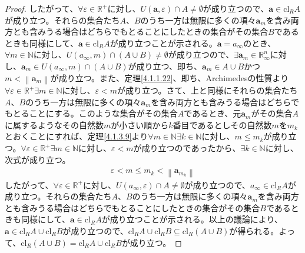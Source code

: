 \documentclass[dvipdfmx]{jsarticle}
\begin{document}
\begin{proof}
したがって、$\forall\varepsilon \in \mathbb{R}^{+}$に対し、$U\left( \mathbf{a},\varepsilon \right) \cap A \neq \emptyset$が成り立つので、$\mathbf{a} \in \mathrm{cl}_{R}A$が成り立つ。それらの集合たち$A$、$B$のうち一方は無限に多くの項々$\mathbf{a}_{m}$を含み両方とも含みうる場合はどちらでもとることにしたときの集合がその集合$B$であるときも同様にして、$\mathbf{a} \in \mathrm{cl}_{R}A$が成り立つことが示される。$\mathbf{a} = a_{\infty}$のとき、$\forall m \in \mathbb{N}$に対し、$U\left( a_{\infty},m \right) \cap (A \cup B) \neq \emptyset$が成り立つので、$\exists\mathbf{a}_{m} \in \mathbb{R}_{\infty}^{n}$に対し、$\mathbf{a}_{m} \in U\left( a_{\infty},m \right) \cap (A \cup B)$が成り立つ、即ち、$\mathbf{a}_{m} \in A \cup B$かつ$m < \left\| \mathbf{a}_{m} \right\|$が成り立つ。また、定理\ref{4.1.1.22}、即ち、Archimedesの性質より$\forall\varepsilon \in \mathbb{R}^{+}\exists m \in \mathbb{N}$に対し、$\varepsilon < m$が成り立つ。さて、上と同様にそれらの集合たち$A$、$B$のうち一方は無限に多くの項々$\mathbf{a}_{m}$を含み両方とも含みうる場合はどちらでもとることにする。このような集合がその集合$A$であるとき、元$\mathbf{a}_{m}$がその集合$A$に属するようなその自然数$m$が小さい順から$k$番目であるとしその自然数$m$を$m_{k}$とおくことにすれば、定理\ref{4.1.3.9}より$\forall m \in \mathbb{N}\exists k \in \mathbb{N}$に対し、$m \leq m_{k}$が成り立つ。$\forall\varepsilon \in \mathbb{R}^{+}\exists m \in \mathbb{N}$に対し、$\varepsilon < m$が成り立つのであったから、$\exists k \in \mathbb{N}$に対し、次式が成り立つ。
\begin{align*}
\varepsilon < m \leq m_{k} < \left\| \mathbf{a}_{m_{k}} \right\|
\end{align*}
したがって、$\forall\varepsilon \in \mathbb{R}^{+}$に対し、$U\left( a_{\infty},\varepsilon \right) \cap A \neq \emptyset$が成り立つので、$a_{\infty} \in \mathrm{cl}_{R}A$が成り立つ。それらの集合たち$A$、$B$のうち一方は無限に多くの項々$\mathbf{a}_{m}$を含み両方とも含みうる場合はどちらでもとることにしたときの集合がその集合$B$であるときも同様にして、$\mathbf{a} \in \mathrm{cl}_{R}A$が成り立つことが示される。以上の議論により、$\mathbf{a} \in \mathrm{cl}_{R}A \cup \mathrm{cl}_{R}B$が成り立つので、$\mathrm{cl}_{R}A \cup \mathrm{cl}_{R}B \subseteq \mathrm{cl}_{R}(A \cup B)$が得られる。よって、$\mathrm{cl}_{R}(A \cup B) = \mathrm{cl}_{R}A \cup \mathrm{cl}_{R}B$が成り立つ。
\end{proof}
\end{document}
